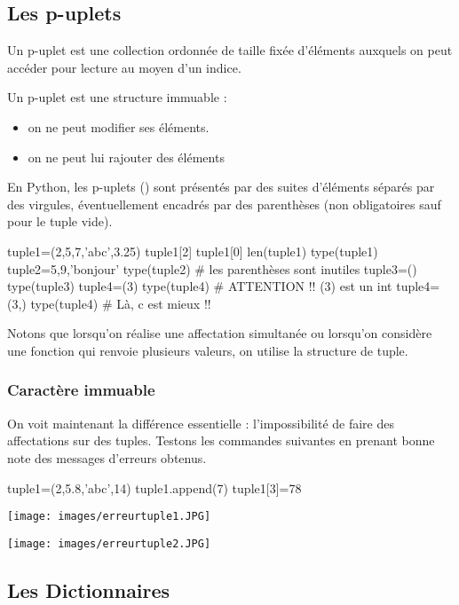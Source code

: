 \documentclass[11pt,a4paper,french,twoside]{PMCours}
\begin{document}
\subsection{Les p-uplets}
\begin{Definition}{}
Un p-uplet est une collection ordonnée de taille fixée d'éléments auxquels on 
peut accéder pour lecture au moyen d'un indice.

Un p-uplet est une structure immuable :
	\begin{itemize}
	\item on ne peut modifier ses éléments.
	\item on ne peut lui rajouter des éléments
	\end{itemize}
\end{Definition}

\medskip
En Python, les p-uplets () sont présentés par des suites d'éléments
séparés par des virgules, éventuellement encadrés par des parenthèses (non 
obligatoires sauf pour le tuple vide).

\medskip
\begin{Python}
tuple1=(2,5,7,'abc',3.25)
tuple1[2]
tuple1[0]
len(tuple1)
type(tuple1)
tuple2=5,9,'bonjour'
type(tuple2) # les parenthèses sont inutiles
tuple3=()
type(tuple3)
tuple4=(3)
type(tuple4) # ATTENTION !! (3) est un int
tuple4=(3,)
type(tuple4) # Là, c est mieux !!
\end{Python}

Notons que lorsqu'on réalise une affectation simultanée ou lorsqu'on considère 
une fonction qui renvoie plusieurs valeurs, on utilise la structure de tuple.

\subsubsection*{Caractère immuable}
On voit maintenant la différence essentielle : l'impossibilité de faire des 
affectations sur des tuples. Testons les commandes suivantes en prenant bonne 
note des messages d'erreurs obtenus. 
\begin{Python}
tuple1=(2,5.8,'abc',14)
tuple1.append(7)
tuple1[3]=78
\end{Python}

\medskip
\texttt{[image: images/erreurtuple1.JPG]}

\vspace{1cm}
\texttt{[image: images/erreurtuple2.JPG]}

\subsection{Les Dictionnaires}
\end{document}
